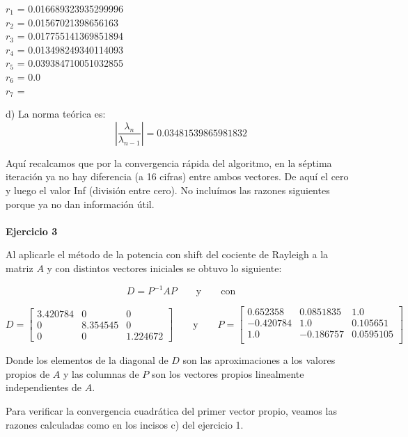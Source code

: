 \documentclass[11pt]{article}
\begin{document}
\begin{multicols}{3}
\noindent
$ r_{1} $ = 0.016689323935299996 \\
$ r_{2} $ = 0.01567021398656163 \\
$ r_{3} $ = 0.017755141369851894 \\
$ r_{4} $ = 0.013498249340114093 \\
$ r_{5} $ = 0.039384710051032855 \\
$ r_{6} $ = 0.0 \\
$ r_{7} $ =  \\
\end{multicols}



d) La norma teórica es:
$$
\left| \frac{\lambda_n}{\lambda_{n-1}} \right| = 0.03481539865981832
$$

Aquí recalcamos que por la convergencia rápida del algoritmo, en la séptima
iteración ya no hay diferencia (a 16 cifras) entre ambos vectores. De aquí el
cero y luego el valor Inf (división entre cero). No incluímos las razones
siguientes porque ya no dan información útil.
\noindent
\\
\\
\noindent
\textbf{Ejercicio 3}

\noindent
Al aplicarle el método de la potencia con shift del cociente de Rayleigh a la matriz $A$ y con distintos vectores iniciales se obtuvo lo siguiente:

\[
 D = P^{-1}AP
 \qquad\text{y}\qquad
\text{con}
 \]

\[
 D =
 \begin{bmatrix}
 3.420784 & 0 & 0 \\
 0 & 8.354545 & 0 \\
 0 & 0 & 1.224672
\end{bmatrix}
 \qquad\text{y}\qquad
P =
 \begin{bmatrix}
  0.652358 &  0.0851835 & 1.0      \\
 -0.420784  & 1.0    &    0.105651 \\
  1.0     &  -0.186757 &  0.0595105 \\
\end{bmatrix}
 \]

Donde los elementos de la diagonal de $D$ son las aproximaciones a los valores propios de $A$ y las columnas de $P$ son los vectores propios linealmente independientes de $A$.

Para verificar la convergencia cuadrática del primer vector propio, veamos las razones calculadas como en los incisos c) del ejercicio 1.
\end{document}
